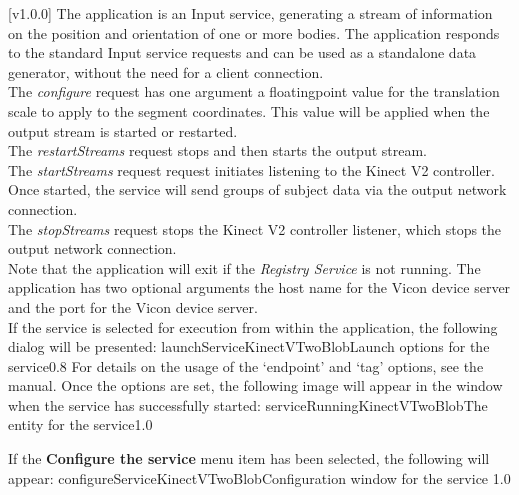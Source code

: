 [v1.0.0]
The  application is an Input service,
generating a stream of information on the position and orientation of one or more bodies.
The application responds to the standard Input service requests and can be used as a
standalone data generator, without the need for a client connection.\\

The \emph{configure} request has one argument \longDash{} a floating\longDash{}point
value for the translation scale to apply to the segment coordinates.
This value will be applied when the output stream is started or restarted.\\ 

The \emph{restartStreams} request stops and then starts the output stream.\\

The \emph{startStreams} request request initiates listening to the Kinect V2 controller.
Once started, the service will send groups of subject data via the output \yarp{} network
connection.\\

The \emph{stopStreams} request stops the Kinect V2 controller listener, which stops the
output \yarp{} network connection.\\ 

Note that the application will exit if the \emph{Registry Service} is not running.
The application has two optional arguments \longDash{} the host name for the Vicon device
server and the port for the Vicon device server.
\insertAppParameters
\condPage
\insertTagDescription{\KVtwoBI}
\insertInputServiceComment\\

\insertStandardServiceCommands
\secondaryEnd
{}
If the service is selected for execution from within the \emph{\MMMU} application, the
following dialog will be presented:
%
{launchServiceKinectVTwoBlob}{Launch options for the \KVtwoBI{} service}{0.8}
\condPage{}
For details on the usage of the `endpoint' and `tag' options, see the \emph{\MMMU} manual.
Once the options are set, the following image will appear in the \emph{\MMMU} window when
the service has successfully started:
%
{serviceRunningKinectVTwoBlob}{The \emph{\MMMU} entity for the \KVtwoBI{} service}{1.0}

If the \textbf{Configure the service} menu item has been selected, the following will
appear:
%
{configureServiceKinectVTwoBlob}{Configuration window for the \emph{\KVtwoBI} service}%
{1.0}
\secondaryEnd
\primaryEnd{}
